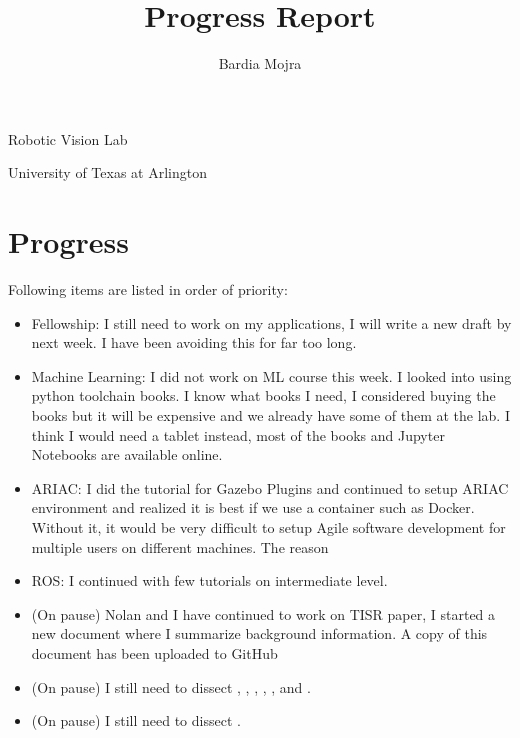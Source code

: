 \documentclass[11pt]{article}
\title{Progress Report}
\author{Bardia Mojra}
\begin{document}
	\maketitle
	\thispagestyle{empty}

\begin{center}
\bigskip
\bigskip
Robotic Vision Lab
 
University of Texas at Arlington
\end{center}

\newpage 

\section{Progress}
Following items are listed in order of priority: 
\begin{itemize}  

  	\item Fellowship: I still need to work on my applications, I will write a new draft by next week. I have been avoiding this for far too long. 
  	
  	\item Machine Learning: I did not work on ML course this week. I looked into using python toolchain books. I know what books I need, I considered buying the books but it will be expensive and we already have some of them at the lab.  I think I would need a tablet instead, most of the books and Jupyter Notebooks are available online. 
  	
  	\item ARIAC: I did the tutorial for Gazebo Plugins and continued to setup ARIAC environment and realized it is best if we use a container such as Docker. Without it, it would be very difficult to setup Agile software development for multiple users on different machines. The reason
      
  	\item ROS: I continued with few tutorials on intermediate level. 
  
  	\item (On pause) Nolan and I have continued to work on TISR paper, I started a new document where I summarize background information. A copy of this document has been uploaded to GitHub 
 
  	\item (On pause) I still need to dissect \cite{PanopticSeg2019}, \cite{SVO}, \cite{HornsMethod}, \cite{NYUV2}, \cite{DGCNNLPC}, and \cite{MaskRCNN}.
  	
  	\item (On pause) I still need to dissect \cite{ZinsserWilliamKnowlton2006Oww}. 
\end{itemize}
\end{document}
